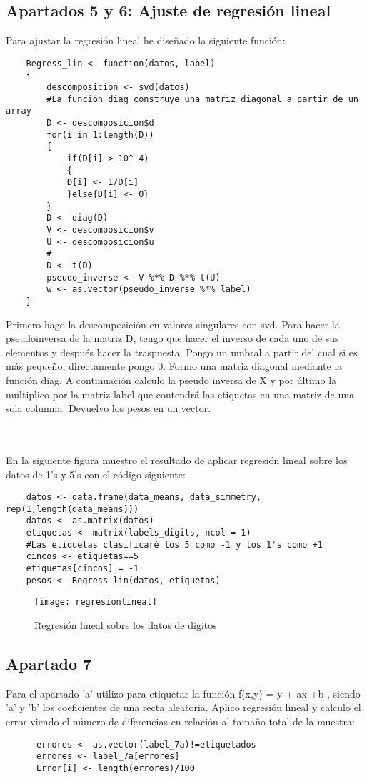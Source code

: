 	\subsection{Apartados 5 y 6: Ajuste de regresión lineal}
	Para ajustar la regresión lineal he diseñado la siguiente función:
	\begin{lstlisting}
	Regress_lin <- function(datos, label)
	{
		descomposicion <- svd(datos)
		#La función diag construye una matriz diagonal a partir de un array
		D <- descomposicion$d
		for(i in 1:length(D))
		{
			if(D[i] > 10^-4)
			{
			D[i] <- 1/D[i]
			}else{D[i] <- 0}
		}
		D <- diag(D)
		V <- descomposicion$v
		U <- descomposicion$u
		#
		D <- t(D)
		pseudo_inverse <- V %*% D %*% t(U)
		w <- as.vector(pseudo_inverse %*% label)
	}
	\end{lstlisting}
	Primero hago la descomposición en valores singulares con svd. Para hacer la pseudoinversa de la matriz D, tengo que hacer el inverso de cada uno de sus elementos y después hacer la traspuesta. Pongo un umbral a partir del cual si es más pequeño, directamente pongo 0. Formo una matriz diagonal mediante la función diag. A continuación calculo la pseudo inversa de X y por último la multiplico por la matriz label que contendrá las etiquetas en una matriz de una sola columna. Devuelvo los pesos en un vector.
	
	\\
	
	\\
	
	En la siguiente figura muestro el resultado de aplicar regresión lineal sobre los datos de 1's y 5's con el código siguiente:
	\begin{lstlisting}
	datos <- data.frame(data_means, data_simmetry, rep(1,length(data_means)))
	datos <- as.matrix(datos)
	etiquetas <- matrix(labels_digits, ncol = 1)
	#Las etiquetas clasificaré los 5 como -1 y los 1's como +1
	cincos <- etiquetas==5
	etiquetas[cincos] = -1
	pesos <- Regress_lin(datos, etiquetas)
	\end{lstlisting}
	
	\begin{figure} [H]
	\centering
	\texttt{[image: regresionlineal]}
	\caption{Regresión lineal sobre los datos de dígitos}
	\label{fig:regresionlineal}
	\end{figure}
	
	\subsection{Apartado 7}
	Para el apartado 'a' utilizo para etiquetar la función f(x,y) = y + ax +b , siendo 'a' y 'b' los coeficientes de una recta aleatoria. Aplico regresión lineal y calculo el error viendo el número de diferencias en relación al tamaño total de la muestra:
	\begin{lstlisting}
	  errores <- as.vector(label_7a)!=etiquetados
	  errores <- label_7a[errores]
	  Error[i] <- length(errores)/100
	\end{lstlisting}
	
